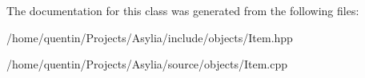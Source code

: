 The documentation for this class was generated from the following files\-:\begin{DoxyCompactItemize}
\item 
/home/quentin/\-Projects/\-Asylia/include/objects/Item.\-hpp\item 
/home/quentin/\-Projects/\-Asylia/source/objects/Item.\-cpp\end{DoxyCompactItemize}
